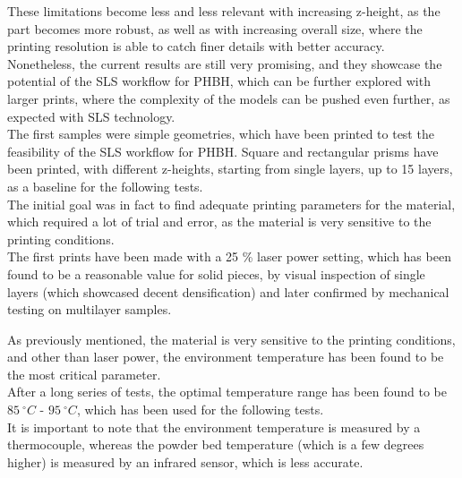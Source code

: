 \documentclass{article}
\begin{document}
          These limitations become less and less relevant with increasing z-height, as the part becomes 
          more robust, as well as with increasing overall size, where the printing resolution 
          is able to catch finer details with better accuracy. \\
  
          Nonetheless, the current results are still very promising, and they showcase the potential of the SLS workflow
          for PHBH, which can be further explored with larger prints, where the complexity of the models 
          can be pushed even further, as expected with SLS technology. \\  
  
          The first samples were simple geometries, which have been printed to test the feasibility of the SLS workflow 
          for PHBH. Square and rectangular prisms have been printed, with different z-heights, starting from single 
          layers, up to 15 layers, as a baseline for the following tests. \\ 
  
          The initial goal was in fact to find adequate printing parameters for the material, which required a lot 
          of trial and error, as the material is very sensitive to the printing conditions. \\
  
          The first prints have been made with a 25 \%  laser power setting, which has been found to be 
          a reasonable value for solid pieces, by visual inspection of single layers (which showcased 
          decent densification) and later confirmed by 
          mechanical testing on multilayer samples. 
          
          \clearpage
  
  
          As previously mentioned, the material is very sensitive to the printing conditions, and other than laser power,
          the environment temperature has been found to be the most critical parameter. \\ 
  
          After a long series of tests, the optimal temperature range has been found to be $85 \ ^{\circ}C$ - $95 \ ^{\circ}C$, which has been
          used for the following tests. \\ 
  
          It is important to note that the environment temperature is measured by a thermocouple, whereas the 
          powder bed temperature (which is a few degrees higher) is measured by an infrared sensor, which  
          is less accurate. 
  
\end{document}
